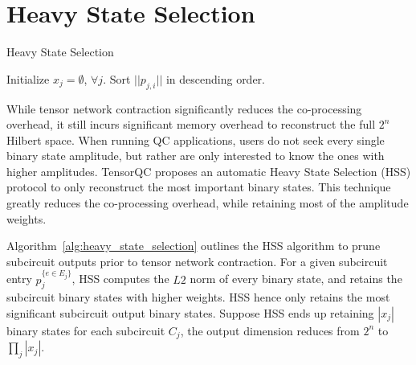 \section{Heavy State Selection}\label{sec:heavy_state_selection}
\begin{algorithm}[t]
    \DontPrintSemicolon
    \SetAlgoLined
    \caption{Heavy State Selection}\label{alg:heavy_state_selection}
    Initialize $x_j=\emptyset$, $\forall j$.\;
    Sort $||p_{j,i}||$ in descending order.\;
\end{algorithm}

While tensor network contraction significantly reduces the co-processing overhead,
it still incurs significant memory overhead to reconstruct the full $2^n$ Hilbert space.
When running QC applications, users do not seek every single binary state amplitude,
but rather are only interested to know the ones with higher amplitudes.
TensorQC proposes an automatic Heavy State Selection (HSS) protocol to only reconstruct the most important binary states.
This technique greatly reduces the co-processing overhead,
while retaining  most of the amplitude weights.

Algorithm~\ref{alg:heavy_state_selection} outlines the HSS algorithm to prune subcircuit outputs prior to tensor network contraction.
For a given subcircuit entry $p_j^{\{e\in E_j\}}$,
HSS computes the $L2$ norm of every binary state,
and retains the subcircuit binary states with higher weights.
HSS hence only retains the most significant subcircuit output binary states.
Suppose HSS ends up retaining $|x_j|$ binary states for each subcircuit $C_j$,
the output dimension reduces from $2^n$ to $\prod_j |x_j|$.
